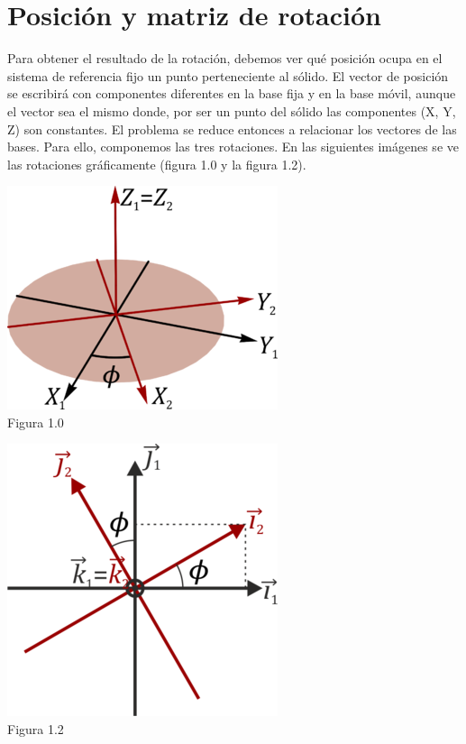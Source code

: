 \documentclass[11pt,a4paper,oldfontcommands,oneside]{memoir}
\begin{document}
\chapter{Posición y matriz de rotación}
Para obtener el resultado de la rotación, debemos ver qué posición ocupa en el sistema de referencia fijo un punto perteneciente al sólido. El vector de posición se escribirá con componentes diferentes en la base fija y en la base móvil, aunque el vector sea el mismo donde, por ser un punto del sólido las componentes (X, Y, Z) son constantes. El problema se reduce entonces a relacionar los vectores de las bases. Para ello, componemos las tres rotaciones. En las siguientes imágenes se ve las rotaciones gráficamente (figura 1.0 y la figura 1.2).

\begin{center}
\includegraphics[scale=2.5]{Angulos.png} 
\\
Figura 1.0
\end{center}

\begin{center}
\includegraphics[scale=2.5]{grafica.png} 
\\
Figura 1.2
\end{center}
\end{document}
